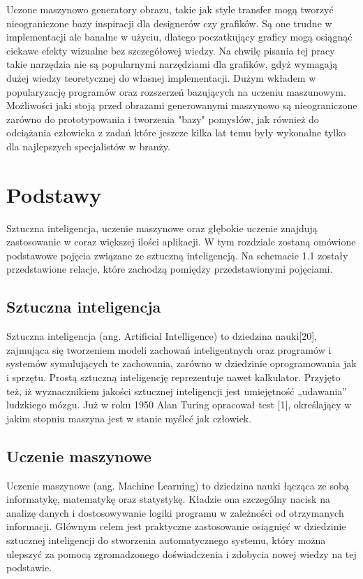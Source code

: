 \documentclass[brudnopis]{xmgr}
\begin{document}
 Uczone maszynowo generatory obrazu, takie jak style transfer mogą tworzyć nieograniczone bazy inspiracji dla designerów czy grafików. Są one trudne w implementacji ale banalne w użyciu, dlatego poczatkujący graficy mogą osiągnąć ciekawe efekty wizualne bez szczegółowej wiedzy. Na chwilę pisania tej pracy takie narzędzia nie są popularnymi narzędziami dla grafików, gdyż wymagają dużej wiedzy teoretycznej do własnej implementacji. Dużym wkładem w popularyzację programów oraz rozszerzeń bazujących na uczeniu maszunowym. Możliwości jaki stoją przed obrazami generowanymi maszynowo są nieograniczone zarówno do prototypowania i tworzenia "bazy" pomysłów, jak również do odciążania człowieka z zadań które jeszcze kilka lat temu były wykonalne tylko dla najlepszych specjalistów w branży.


\chapter{Podstawy\label{s:dtd}}

Sztuczna inteligencja, uczenie maszynowe oraz głębokie uczenie znajdują zastosowanie w coraz większej ilości aplikacji. W tym rozdziale zostaną omówione podstawowe pojęcia związane ze sztuczną inteligencją. Na schemacie 1.1 zostały przedstawione relacje, które zachodzą pomiędzy przedstawionymi pojęciami.

\section{Sztuczna inteligencja}

Sztuczna inteligencja (ang. Artificial Intelligence) to dziedzina nauki[20], zajmująca się tworzeniem modeli zachowań inteligentnych oraz programów i systemów symulujących te zachowania, zarówno w dziedzinie oprogramowania jak i sprzętu. Prostą sztuczną inteligencję reprezentuje nawet kalkulator. Przyjęto też, iż wyznacznikiem jakości sztucznej inteligencji jest umiejętność „udawania” ludzkiego mózgu. Już w roku 1950 Alan Turing opracował test [1], określający w jakim stopniu maszyna jest w stanie myśleć jak człowiek.



\section{Uczenie maszynowe}

Uczenie maszynowe (ang. Machine Learning) to dziedzina nauki łącząca ze sobą informatykę, matematykę oraz statystykę. Kładzie ona szczególny nacisk na analizę danych i dostosowywanie logiki programu w zależności od otrzymanych informacji. Głównym celem jest praktyczne zastosowanie osiągnięć w dziedzinie sztucznej inteligencji do stworzenia automatycznego systemu, który można ulepszyć za pomocą zgromadzonego doświadczenia i zdobycia nowej wiedzy na tej podstawie.
\end{document}
